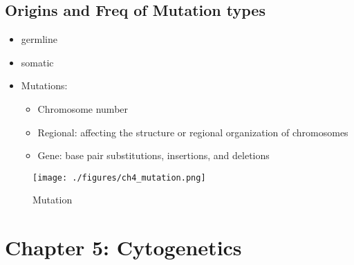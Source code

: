 \documentclass{scrartcl}
\begin{document}
\subsection{Origins and Freq of Mutation types}
\label{sec:org036d904}
\begin{itemize}
\item germline
\item somatic
\item Mutations:
\begin{itemize}
\item Chromosome number
\item Regional: affecting the structure or regional organization of chromosomes
\item Gene: base pair substitutions, insertions, and deletions
\end{itemize}
\end{itemize}

\begin{figure}[htbp]
\centering
\texttt{[image: ./figures/ch4\_mutation.png]}
\caption{\label{fig:org78616b1}
Mutation}
\end{figure}

\section{Chapter 5: Cytogenetics}
\label{sec:orgff8dfe3}
\end{document}
